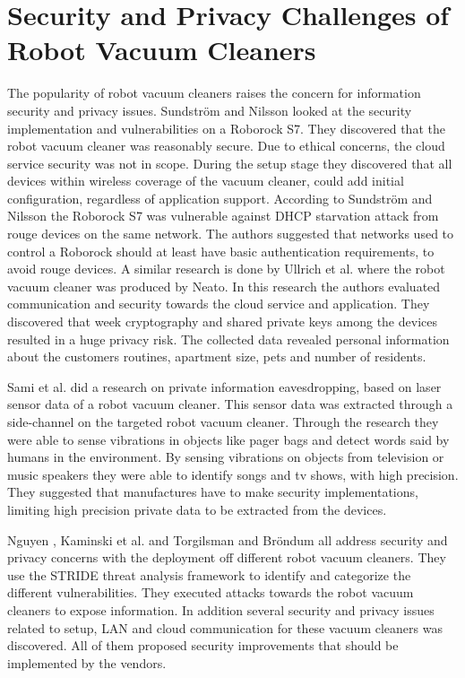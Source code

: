 \section{Security and Privacy Challenges of Robot Vacuum Cleaners}
The popularity of robot vacuum cleaners raises the concern for information security and privacy issues. Sundström and Nilsson \cite{Roborockvulnerability} looked at the security implementation and vulnerabilities on a Roborock S7. They discovered that the robot vacuum cleaner was reasonably secure. Due to ethical concerns, the cloud service security was not in scope. During the setup stage they discovered that all devices within wireless coverage of the vacuum cleaner, could add initial configuration, regardless of application support. According to Sundström and Nilsson \cite{Roborockvulnerability} the Roborock S7 was vulnerable against \gls{DHCP} starvation attack from rouge devices on the same network. The authors suggested that networks used to control a Roborock should at least have basic authentication requirements, to avoid rouge devices. 
A similar research is done by Ullrich et al. \cite{Neato} where the robot vacuum cleaner was produced by Neato. In this research the authors evaluated communication and security towards the cloud service and application. They discovered that week cryptography and shared private keys among the devices resulted in a huge privacy risk. The collected data revealed personal information about the customers routines, apartment size, pets and number of residents. 

Sami et al. \cite{lindaeavesdropping} did a research on private information eavesdropping, based on laser sensor data of a robot vacuum cleaner.  This sensor data was extracted through a side-channel on the targeted robot vacuum cleaner. Through the research they were able to sense vibrations in objects like pager bags and detect words said by humans in the environment. By sensing vibrations on objects from television or music speakers they were able to identify songs and tv shows, with high precision. They suggested that manufactures have to make security implementations, limiting high precision private data to be extracted from the devices.

Nguyen \cite{robotvacuum_voulne_nguyendeep}, Kaminski et al. \cite{robotvacuum_voulne1_kaminski2016averting} and Torgilsman and Bröndum \cite{robotvacuum_voulne2_torgilsman2020ethical} all address security and privacy concerns with the deployment off different robot vacuum cleaners. They use the STRIDE threat analysis framework to identify and categorize the different vulnerabilities. They executed attacks towards the robot vacuum cleaners to expose information. In addition several security and privacy issues related to setup, \gls{LAN} and cloud communication for these vacuum cleaners was discovered. All of them proposed security improvements that should be implemented by the vendors. 

